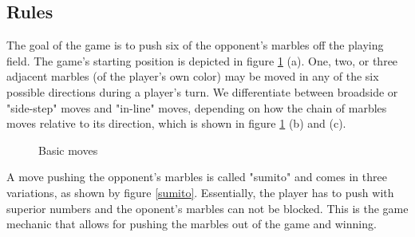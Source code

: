 \documentclass{llncs}
\begin{document}
\subsection{Rules}
The goal of the game is to push six of the opponent's marbles off the playing field. The game's starting position is depicted in figure \ref{basics} (a). One, two, or three adjacent marbles (of the player's own color) may be moved in any of the six possible directions during a player's turn. We differentiate between broadside or "side-step" moves and "in-line" moves, depending on how the chain of marbles moves relative to its direction, which is shown in figure \ref{basics} (b) and (c).

\begin{figure}[!h]
  \centering
  \hfill
  \hfill
  \caption{Basic moves \cite{abalone_sa_abalone_nodate}}
  \label{basics}
\end{figure}

A move pushing the opponent's marbles is called "sumito" and comes in three variations, as shown by figure \ref{sumito}. Essentially, the player has to push with superior numbers and the oponent's marbles can not be blocked. This is the game mechanic that allows for pushing the marbles out of the game and winning.
\end{document}
